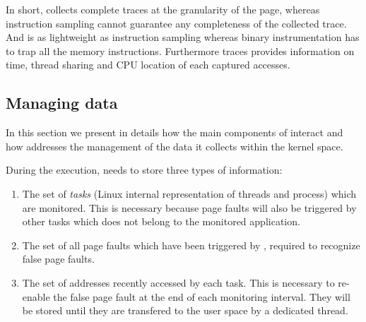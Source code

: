 In short, \Moca collects complete traces at the granularity of the page, whereas instruction
sampling cannot guarantee any completeness of the collected trace. And \Moca is as lightweight
as instruction sampling whereas binary instrumentation has to trap all the memory instructions.
Furthermore \Moca traces provides information on time, thread sharing and CPU
location of each captured accesses.


\subsection{Managing data}
\label{sec:design-tech}

In this section we present in details how the main components of \Moca
interact and how \Moca addresses the management of the data it collects
within the kernel space.

During the execution, \Moca needs to store three types of information:
\begin{enumerate}
    \item The set of \emph{tasks} (Linux internal representation of threads and process) which are
monitored. This is necessary because page faults will also be triggered by other tasks which does not belong to
the monitored application.
    \item The set of all page faults which have been triggered by \Moca,
        required to recognize false page faults.
    \item The set of addresses recently accessed by each task. This is
        necessary to re-enable the false page fault at the end of each
        monitoring interval.  They will be stored until they are transfered to
        the user space by a dedicated thread.
\end{enumerate}

